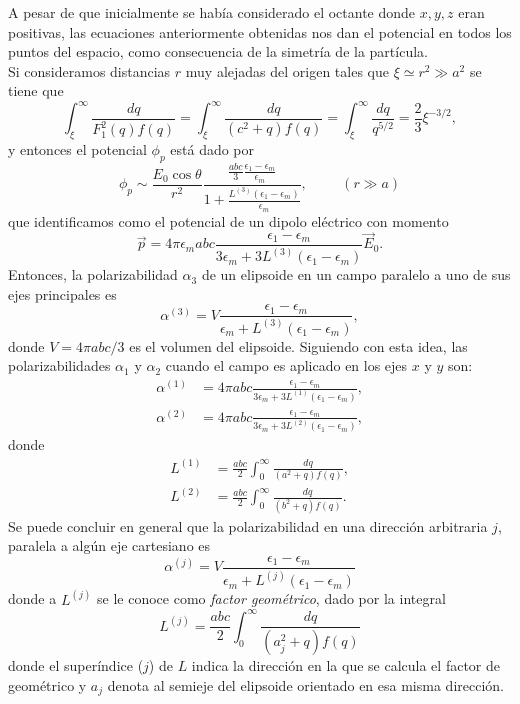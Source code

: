 \documentclass[paper=letter, fontsize=12pt,]{article}
\begin{document}
A pesar de que inicialmente se había considerado el octante donde $x,y,z$ eran positivas, las ecuaciones anteriormente obtenidas nos dan el potencial en todos los puntos del espacio, como consecuencia de la simetría de la partícula.\\

Si consideramos distancias $r$ muy alejadas del origen tales que $\xi\simeq r^2\gg a^2$ se tiene que
\begin{equation*}
    \int_{\xi}^{\infty}\frac{dq}{F_1^2(q)f(q)}= \int_{\xi}^{\infty}\frac{dq}{(c^2+q)f(q)}=\int_{\xi}^{\infty}\frac{dq}{q^{5/2}}=\frac{2}{3}\xi^{-3/2},
\end{equation*}
y entonces el potencial $\phi_p$ está dado por
\begin{equation}
    \phi_p\sim\frac{E_0\cos\theta}{r^2}\frac{\frac{abc}{3}\frac{\epsilon_1-\epsilon_m}{\epsilon_m}}{1+\frac{L^{(3)}(\epsilon_1-\epsilon_m)}{\epsilon_m}},\hspace{1cm}(r\gg a)
\end{equation}
que identificamos como el potencial de un dipolo eléctrico con momento 
\begin{equation}
    \Vec{p}=4\pi\epsilon_m abc\frac{\epsilon_1-\epsilon_m}{3\epsilon_m+3L^{(3)}(\epsilon_1-\epsilon_m)}\Vec{E}_0
    \label{momento_dip}.
\end{equation}
Entonces, la polarizabilidad $\alpha_3$ de un elipsoide en un campo paralelo a uno de sus ejes principales es
\begin{equation}
    \alpha^{(3)}=V\frac{\epsilon_1-\epsilon_m}{\epsilon_m+L^{(3)}(\epsilon_1-\epsilon_m)},
\end{equation}
donde $V=4\pi abc/3$ es el volumen del elipsoide. Siguiendo con esta idea, las polarizabilidades $\alpha_1$ y $\alpha_2$ cuando el campo es aplicado en los ejes $x$ y $y$ son:
\begin{align}
    \alpha^{(1)}&=4\pi abc \frac{\epsilon_1-\epsilon_m}{3\epsilon_m+3L^{(1)}(\epsilon_1-\epsilon_m)},\\
    \alpha^{(2)}&=4\pi abc \frac{\epsilon_1-\epsilon_m}{3\epsilon_m+3L^{(2)}(\epsilon_1-\epsilon_m)},
\end{align}
donde 
\begin{align}
    L^{(1)}&=\frac{abc}{2}\int_{0}^{\infty}\frac{dq}{(a^2+q)f(q)},\\
    L^{(2)}&=\frac{abc}{2}\int_{0}^{\infty}\frac{dq}{(b^2+q)f(q)}.
\end{align}
Se puede concluir en general que la polarizabilidad en una dirección arbitraria $j$, paralela a algún eje cartesiano es
\begin{equation}
    \alpha^{(j)}=V\frac{\epsilon_1-\epsilon_m}{\epsilon_m+L^{(j)}(\epsilon_1-\epsilon_m)}
\end{equation}
donde a $L^{(j)}$ se le conoce como \textit{factor geométrico}, dado por la integral 
\begin{equation}
    L^{(j)}=\frac{abc}{2}\int_0^{\infty}\frac{dq}{(a_j^2+q)f(q)}
\end{equation}
donde el superíndice ($j$) de $L$ indica la dirección en la que se calcula el factor de geométrico y $a_j$ denota al semieje del elipsoide orientado en esa misma dirección. 
\end{document}
